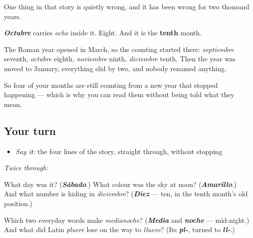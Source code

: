 \begin{culture}
One thing in that story is quietly wrong, and it has been wrong for two thousand years.

\emph{\textbf{Octubre}} carries \emph{ocho} inside it. Eight. And it is the \textbf{tenth} month.

The Roman year opened in March, so the counting started there: \emph{septiembre} seventh, \emph{octubre} eighth, \emph{noviembre} ninth, \emph{diciembre} tenth. Then the year was moved to January, everything slid by two, and nobody renamed anything.

So four of your months are still counting from a new year that stopped happening — which is why you can read them without being told what they mean.
\end{culture}

\subsection*{Your turn}
\begin{itemize}
\raggedright
  \item \emph{Say it:} the four lines of the story, straight through, without stopping
\end{itemize}

\emph{Twice through:}

\begin{tcolorbox}[breakable,colback=teal!4,colframe=teal!35!black,title={Before you move on}]
What day was it? (\emph{\textbf{Sábado}}.) What colour was the sky at noon? (\emph{\textbf{Amarillo}}.) And what number is hiding in \emph{diciembre}? (\emph{\textbf{Diez}} — ten, in the tenth month's old position.)

Which two everyday words make \emph{medianoche}? (\emph{\textbf{Media}} and \emph{\textbf{noche}} — mid-night.) And what did Latin \emph{pluere} lose on the way to \emph{llueve}? (Its \emph{\textbf{pl-}}, turned to \emph{\textbf{ll-}}.)
\end{tcolorbox}
